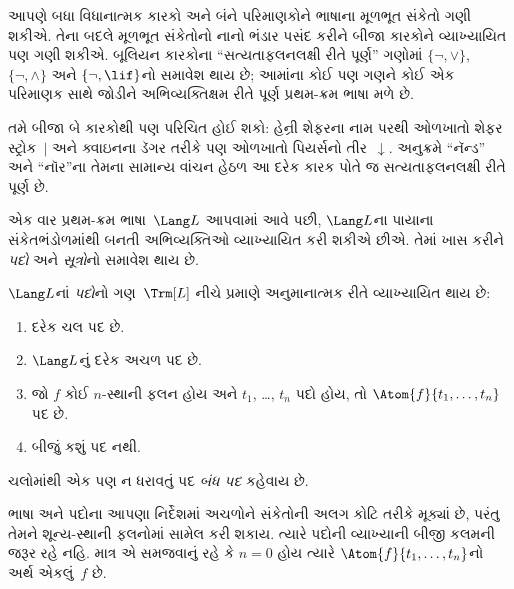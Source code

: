 \begin{explain}
આપણે બધા વિધાનાત્મક કારકો અને બંને પરિમાણકોને ભાષાના મૂળભૂત સંકેતો
ગણી શકીએ. તેના બદલે મૂળભૂત સંકેતોનો નાનો ભંડાર પસંદ કરીને બીજા
કારકોને વ્યાખ્યાયિત પણ ગણી શકીએ. બૂલિયન કારકોના
``સત્યતાફલનલક્ષી રીતે પૂર્ણ'' ગણોમાં $\{ \lnot, \lor \}$,
$\{ \lnot, \land \}$ અને $\{ \lnot, \lif\}$નો સમાવેશ થાય છે;
આમાંના કોઈ પણ ગણને કોઈ એક પરિમાણક સાથે જોડીને અભિવ્યક્તિક્ષમ રીતે
પૂર્ણ પ્રથમ-ક્રમ ભાષા મળે છે.

તમે બીજા બે કારકોથી પણ પરિચિત હોઈ શકો: હેન્રી શેફરના નામ
પરથી ઓળખાતો શેફર સ્ટ્રોક~$|$ અને ક્વાઇનના ડૅગર તરીકે પણ ઓળખાતો
પિયર્સનો તીર~$\downarrow$. અનુક્રમે ``નૅન્ડ'' અને ``નૉર''ના તેમના
સામાન્ય વાંચન હેઠળ આ દરેક કારક પોતે જ સત્યતાફલનલક્ષી રીતે પૂર્ણ છે.
\end{explain}
\endgroup


\begingroup
\makeatletter{}\makeatother


\label{guunit:OLP-0152}


એક વાર પ્રથમ-ક્રમ ભાષા~$\Lang L$ આપવામાં આવે પછી, $\Lang L$ના પાયાના
સંકેતભંડોળમાંથી બનતી અભિવ્યક્તિઓ વ્યાખ્યાયિત કરી શકીએ છીએ. તેમાં ખાસ
કરીને \emph{પદો} અને \emph{સૂત્રો}નો સમાવેશ થાય છે.

\begin{defn}[પદો]
$\Lang L$નાં \emph{પદો}નો ગણ~$\Trm[L]$ નીચે પ્રમાણે અનુમાનાત્મક રીતે
વ્યાખ્યાયિત થાય છે:
\begin{enumerate}
\item દરેક ચલ પદ છે.
\item $\Lang L$નું દરેક અચળ પદ છે.
\item જો $f$ કોઈ $n$-સ્થાની ફલન હોય અને $t_1$, \dots, $t_n$
  પદો હોય, તો $\Atom{f}{t_1, \ldots, t_n}$ પદ છે.
\item 
  બીજું કશું પદ નથી.
\end{enumerate}
ચલોમાંથી એક પણ ન ધરાવતું પદ \emph{બંધ પદ} કહેવાય છે.
\end{defn}

\begin{explain}
ભાષા અને પદોના આપણા નિર્દેશમાં અચળોને સંકેતોની અલગ કોટિ
તરીકે મૂક્યાં છે, પરંતુ તેમને શૂન્ય-સ્થાની ફલનોમાં સામેલ કરી
શકાય. ત્યારે પદોની વ્યાખ્યાની બીજી કલમની જરૂર રહે નહિ. માત્ર એ
સમજવાનું રહે કે $n=0$ હોય ત્યારે $\Atom{f}{t_1, \ldots, t_n}$નો અર્થ
એકલું~$f$ છે.
\end{explain}

